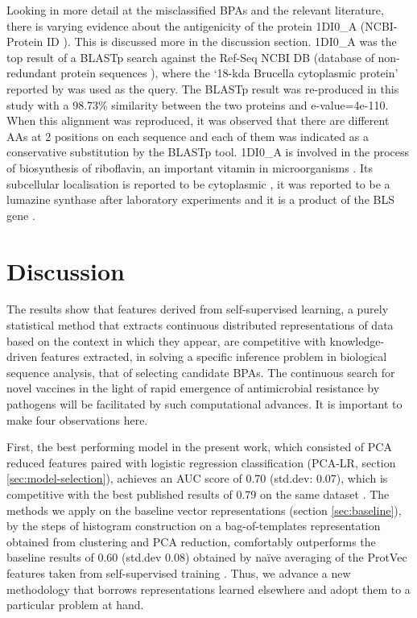 \documentclass[10pt,journal,compsoc,twoside]{IEEEtran}
\begin{document}
Looking in more detail at the misclassified BPAs and the relevant literature, there is varying evidence about the antigenicity of the protein 1DI0\_A (NCBI-Protein ID \cite{1DI0_A}). This is discussed more in the discussion section. 1DI0\_A was the top result \cite{heinson_2017} of a BLASTp \cite{blast} search against the Ref-Seq NCBI DB (database of non-redundant protein sequences \cite{ncbi-prot-nr-db}), where the ‘18-kda Brucella cytoplasmic protein’ reported by \cite{goldbaum_velikovsky_1999} was used as the query. The BLASTp result was re-produced in this study with a 98.73\% similarity between the two proteins and e-value=4e-110. When this alignment was reproduced, it was observed that there are different AAs at 2 positions on each sequence and each of them was indicated as a conservative substitution by the BLASTp tool. 1DI0\_A is involved in the process of biosynthesis of riboflavin, an important vitamin in microorganisms \cite{riboflavin}. Its subcellular localisation is reported to be cytoplasmic \cite{psortb}, it was reported to be a lumazine synthase after laboratory experiments \cite{goldbaum_velikovsky_1999} and it is a product of the BLS gene \cite{BLS}.


\section{Discussion}
\label{sec:Discussion}

The results show that features derived from self-supervised learning, a purely statistical method that extracts continuous distributed representations of data based on the context in which they appear, are competitive with knowledge-driven features extracted, in solving a specific inference problem in biological sequence analysis, that of selecting candidate BPAs. The continuous search for novel vaccines in the light of rapid emergence of antimicrobial resistance by pathogens will be facilitated by such computational advances. It is important to make four observations here. 

First, the best performing model in the present work, which consisted of PCA reduced features paired with logistic regression classification (PCA-LR, section \ref{sec:model-selection}), achieves an AUC score of 0.70 (std.dev: 0.07), which is competitive with the best published results of 0.79 on the same dataset \cite{heinson_2017} \cite{dalsass_2019}. The methods we apply on the baseline vector representations (section \ref{sec:baseline}), by the steps of histogram construction on a bag-of-templates representation obtained from clustering and PCA reduction, comfortably outperforms the baseline results of 0.60 (std.dev 0.08) obtained by naïve averaging of the ProtVec features taken from self-supervised training \cite{protvec}. Thus, we advance a new methodology that borrows representations learned elsewhere and adopt them to a particular problem at hand.
\end{document}
